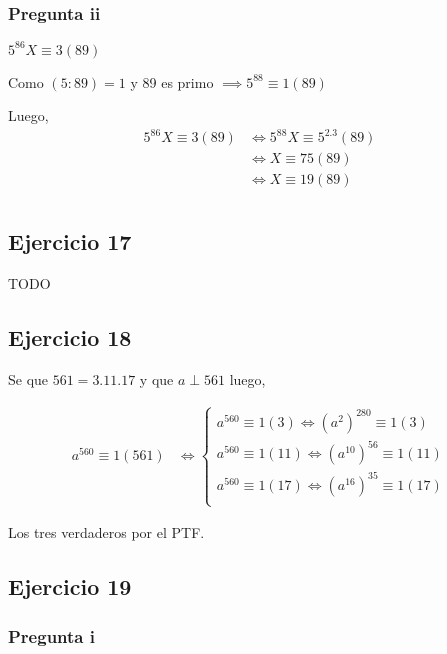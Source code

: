 \subsubsection{Pregunta ii}

$ 5^{86}X \equiv 3(89) $

Como $ (5:89) = 1 $ y 89 es primo $ \implies 5^{88} \equiv 1(89) $

Luego,
\begin{align*}
    5^{86}X \equiv 3(89) &\iff 5^{88}X \equiv 5^2.3(89) \\
    &\iff X \equiv 75(89) \\
    &\iff X \equiv 19(89) \\
\end{align*}

\subsection{Ejercicio 17}
TODO

\subsection{Ejercicio 18}

Se que $ 561 = 3.11.17 $ y que $ a \perp 561 $ luego,

\begin{align*}
    a^{560} \equiv 1(561) &\iff \begin{cases}
        a^{560}\equiv 1(3) \iff (a^2)^{280} \equiv 1(3) \\
        a^{560}\equiv 1(11) \iff (a^{10})^{56} \equiv 1(11) \\
        a^{560}\equiv 1(17) \iff (a^{16})^{35} \equiv 1(17) \\
    \end{cases}
\end{align*}

Los tres verdaderos por el PTF.

\subsection{Ejercicio 19}

\subsubsection{Pregunta i}

